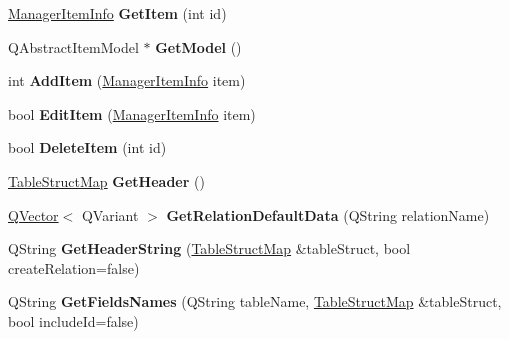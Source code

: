 \begin{DoxyCompactItemize}
\item 
\hyperlink{class_i_extendable_data_base_manager_plugin_1_1_manager_data_item}{Manager\+Item\+Info} {\bfseries Get\+Item} (int id)\hypertarget{class_table_handler_a8777b1d56a8c440112cd5a8508142819}{}\label{class_table_handler_a8777b1d56a8c440112cd5a8508142819}

\item 
Q\+Abstract\+Item\+Model $\ast$ {\bfseries Get\+Model} ()\hypertarget{class_table_handler_ac2a1680219752ae5d66b69b3269aee82}{}\label{class_table_handler_ac2a1680219752ae5d66b69b3269aee82}

\item 
int {\bfseries Add\+Item} (\hyperlink{class_i_extendable_data_base_manager_plugin_1_1_manager_data_item}{Manager\+Item\+Info} item)\hypertarget{class_table_handler_a3723c124eddfb0931caa7c3300320226}{}\label{class_table_handler_a3723c124eddfb0931caa7c3300320226}

\item 
bool {\bfseries Edit\+Item} (\hyperlink{class_i_extendable_data_base_manager_plugin_1_1_manager_data_item}{Manager\+Item\+Info} item)\hypertarget{class_table_handler_aee4aa90513382109de7c1bc685de5e8a}{}\label{class_table_handler_aee4aa90513382109de7c1bc685de5e8a}

\item 
bool {\bfseries Delete\+Item} (int id)\hypertarget{class_table_handler_af923ed419b08329aff43715a4cf8e5fa}{}\label{class_table_handler_af923ed419b08329aff43715a4cf8e5fa}

\item 
\hyperlink{class_q_map}{Table\+Struct\+Map} {\bfseries Get\+Header} ()\hypertarget{class_table_handler_aa95f95bc82d4e627c6394bb41b4305a6}{}\label{class_table_handler_aa95f95bc82d4e627c6394bb41b4305a6}

\item 
\hyperlink{class_q_vector}{Q\+Vector}$<$ Q\+Variant $>$ {\bfseries Get\+Relation\+Default\+Data} (Q\+String relation\+Name)\hypertarget{class_table_handler_a69bf32558769e5d52cc2596b8883f258}{}\label{class_table_handler_a69bf32558769e5d52cc2596b8883f258}

\item 
Q\+String {\bfseries Get\+Header\+String} (\hyperlink{class_q_map}{Table\+Struct\+Map} \&table\+Struct, bool create\+Relation=false)\hypertarget{class_table_handler_a33f05e63998bdf3e1e99982bd9dc272c}{}\label{class_table_handler_a33f05e63998bdf3e1e99982bd9dc272c}

\item 
Q\+String {\bfseries Get\+Fields\+Names} (Q\+String table\+Name, \hyperlink{class_q_map}{Table\+Struct\+Map} \&table\+Struct, bool include\+Id=false)\hypertarget{class_table_handler_a9b8e9eb6a4c98d82237ab1e31effcc8a}{}\label{class_table_handler_a9b8e9eb6a4c98d82237ab1e31effcc8a}

\end{DoxyCompactItemize}
